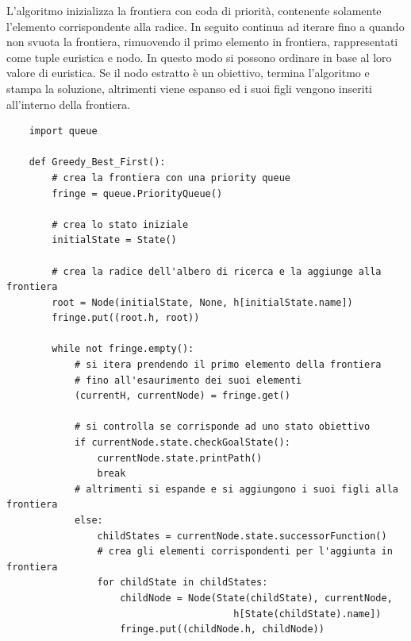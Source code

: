 \documentclass{article}
\numberwithin{equation}{section}
\begin{document}
L'algoritmo inizializza la frontiera con coda di priorità, contenente solamente l'elemento 
corrispondente alla radice. In seguito continua ad iterare fino a quando non svuota la 
frontiera, rimuovendo il primo elemento in frontiera, rappresentati come tuple euristica e 
nodo. In questo modo si possono ordinare in base al loro valore di euristica. Se il nodo 
estratto è un obiettivo, termina l'algoritmo e stampa la soluzione, altrimenti viene espanso ed i suoi 
figli vengono inseriti all'interno della frontiera. 
\begin{verbatim}
    import queue 

    def Greedy_Best_First():
        # crea la frontiera con una priority queue
        fringe = queue.PriorityQueue() 

        # crea lo stato iniziale
        initialState = State()

        # crea la radice dell'albero di ricerca e la aggiunge alla frontiera
        root = Node(initialState, None, h[initialState.name])
        fringe.put((root.h, root))

        while not fringe.empty():
            # si itera prendendo il primo elemento della frontiera
            # fino all'esaurimento dei suoi elementi
            (currentH, currentNode) = fringe.get()

            # si controlla se corrisponde ad uno stato obiettivo
            if currentNode.state.checkGoalState():
                currentNode.state.printPath()
                break
            # altrimenti si espande e si aggiungono i suoi figli alla frontiera
            else: 
                childStates = currentNode.state.successorFunction()
                # crea gli elementi corrispondenti per l'aggiunta in frontiera
                for childState in childStates:
                    childNode = Node(State(childState), currentNode, 
                                        h[State(childState).name])
                    fringe.put((childNode.h, childNode))
\end{verbatim}
\end{document}
